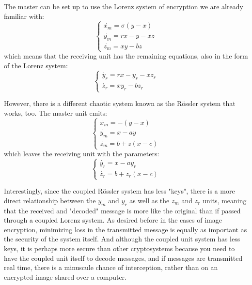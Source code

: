 The master can be set up to use the Lorenz system of encryption we are already familiar with:
\begin{equation}
\begin{cases} 
\dot{x_{m}} = \sigma(y-x) \\ 
\dot{y_{m}} = rx - y - xz \\ 
\dot{z_{m}} = xy - bz
\end{cases}
\end{equation}
which means that the receiving unit has the remaining equations, also in the form of the Lorenz system:
\begin{equation}
\begin{cases} 
\dot{y_{r}} = rx - y_{r} - xz_{r} \\ 
\dot{z_{r}} = xy_{r} - bz_{r}
\end{cases}
\end{equation}

However, there is a different chaotic system known as the R\"{o}ssler system that works, too. The master unit emits:
\begin{equation}
\begin{cases} 
\dot{x_{m}} = -(y-x) \\ 
\dot{y_{m}} = x - ay  \\ 
\dot{z_{m}} = b+z(x-c)
\end{cases}
\end{equation}
which leaves the receiving unit with the parameters: 
\begin{equation}
\begin{cases} 
\dot{y_{r}} = x - ay_{r} \\ 
\dot{z_{r}} = b+z_{r}(x-c)
\end{cases}
\end{equation}

Interestingly, since the coupled R\"{o}ssler system has less "keys", there is a more direct relationship between the {$y_{m}$} and {$y_{r}$} as well as the {$z_{m}$} and {$z_{r}$} units, meaning that the received and "decoded" message is more like the original than if passed through a coupled Lorenz system.  As desired before in the cases of image encryption, minimizing loss in the transmitted message is equally as important as the security of the system itself.  And although the coupled unit system has less keys, it is perhaps more secure than other cryptosystems because you need to have the coupled unit itself to decode messages, and if messages are transmitted real time, there is a minuscule chance of interception, rather than on an encrypted image shared over a computer. 

